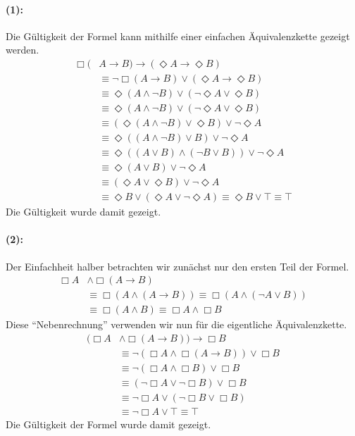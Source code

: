 \begin{multicols}{2}
      \paragraph{(1):} %
      Die Gültigkeit der Formel kann mithilfe einer einfachen Äquivalenzkette gezeigt werden.
      \begin{align*}
        \Box(&A→B) → (\Diamond A→\Diamond B) \\
        &\equiv ¬\Box(A\to B) \lor (\Diamond A \to \Diamond B) \\
        &\equiv \Diamond(A\land \lnot B) \lor (\lnot\Diamond A \lor \Diamond B) \\
        &\equiv \Diamond(A\land\lnot B) \lor (\lnot\Diamond A \lor \Diamond B) \\
        &\equiv (\Diamond(A\land\lnot B) \lor \Diamond B) \lor \lnot\Diamond A \\
        &\equiv \Diamond((A\land\lnot B)\lor B) \lor \lnot\Diamond A \\
        &\equiv \Diamond((A\lor B) \land (\lnot B \lor B)) \lor \lnot\Diamond A \\
        &\equiv \Diamond(A\lor B) \lor \lnot\Diamond A \\
        &\equiv (\Diamond A \lor \Diamond B) \lor \lnot\Diamond A \\
        &\equiv \Diamond B \lor (\Diamond A \lor \lnot\Diamond A) \equiv \Diamond B \lor \top \equiv \top
      \end{align*}
      Die Gültigkeit wurde damit gezeigt.\qedbox

      \paragraph{(2):}
      Der Einfachheit halber betrachten wir zunächst nur den ersten Teil der Formel.
      \begin{align*}
        \Box A&\land \Box(A\to B) \\
        &\equiv \Box(A\land(A\to B)) \equiv \Box(A\land(\lnot A \lor B)) \\
        &\equiv \Box(A\land B) \equiv \Box A \land \Box B
      \end{align*}
      Diese \enquote{Nebenrechnung} verwenden wir nun für die eigentliche Äquivalenzkette.
      \begin{align*}
        (\Box A&\land \Box(A\to B)) \to \Box B \\
        &\equiv \lnot(\Box A\land \Box(A\to B)) \lor \Box B \\
        &\equiv \lnot (\Box A \land \Box B) \lor \Box B \\
        &\equiv (\lnot\Box A \lor \lnot\Box B) \lor \Box B \\
        &\equiv \lnot\Box A \lor (\lnot\Box B \lor \Box B) \\
        &\equiv \lnot\Box A \lor \top \equiv \top
      \end{align*}
      Die Gültigkeit der Formel wurde damit gezeigt.\qedbox


\end{multicols}
